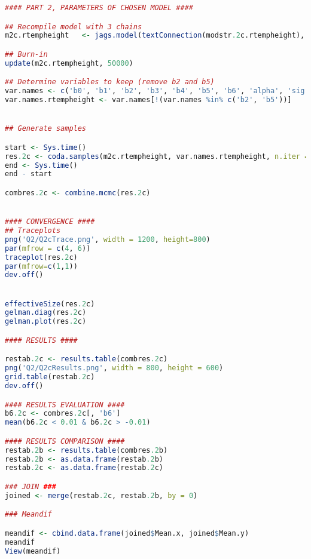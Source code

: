 \documentclass[11pt]{article}
\begin{document}
\begin{lstlisting}[language=R]
#### PART 2, PARAMETERS OF CHOSEN MODEL ####

## Recompile model with 3 chains
m2c.rtempheight   <- jags.model(textConnection(modstr.2c.rtempheight), n.chains = 3, data = data)

## Burn-in
update(m2c.rtempheight, 50000)

## Determine variables to keep (remove b2 and b5)
var.names <- c('b0', 'b1', 'b2', 'b3', 'b4', 'b5', 'b6', 'alpha', 'sig.alpha')
var.names.rtempheight <- var.names[!(var.names %in% c('b2', 'b5'))]


## Generate samples

start <- Sys.time()
res.2c <- coda.samples(m2c.rtempheight, var.names.rtempheight, n.iter = 150000, thin = 50)
end <- Sys.time()
end - start

combres.2c <- combine.mcmc(res.2c)


#### CONVERGENCE ####
## Traceplots
png('Q2/Q2cTrace.png', width = 1200, height=800)
par(mfrow = c(4, 6))
traceplot(res.2c)
par(mfrow=c(1,1))
dev.off()


effectiveSize(res.2c)
gelman.diag(res.2c)
gelman.plot(res.2c)

#### RESULTS ####

restab.2c <- results.table(combres.2c)
png('Q2/Q2cResults.png', width = 800, height = 600)
grid.table(restab.2c)
dev.off()

#### RESULTS EVALUATION ####
b6.2c <- combres.2c[, 'b6']
mean(b6.2c < 0.01 & b6.2c > -0.01)

#### RESULTS COMPARISON ####
restab.2b <- results.table(combres.2b)
restab.2b <- as.data.frame(restab.2b)
restab.2c <- as.data.frame(restab.2c)

### JOIN ###
joined <- merge(restab.2c, restab.2b, by = 0)

### Meandif

meandif <- cbind.data.frame(joined$Mean.x, joined$Mean.y)
meandif
View(meandif)
\end{lstlisting}


\newpage
\end{document}
